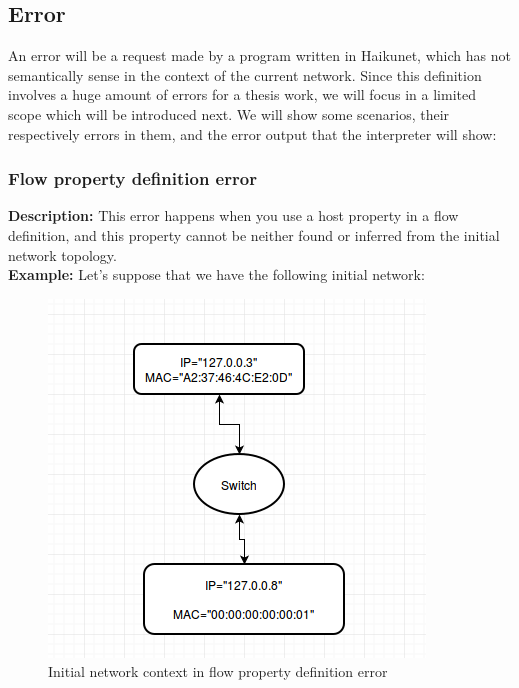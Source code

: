 \subsection{Error}

An error will be a request made by a program written in Haikunet, which has not semantically sense in the context of the current network. Since this definition involves a huge amount of errors for a thesis work, we will focus in a limited scope which will be introduced next. We will show some scenarios, their respectively errors in them, and the error output that the interpreter will show:

\subsubsection{Flow property definition error}

\textbf{Description:} This error happens when you use a host property in a flow definition, and this property cannot be neither found or inferred from the initial network topology. \\

\textbf{Example:} Let's suppose that we have the following initial network:

\begin{figure}[H]
\centering
\includegraphics[width=\textwidth]{images/haikunet/error_scenario_1.png}
\caption{Initial network context in flow property definition error}
\end{figure}

